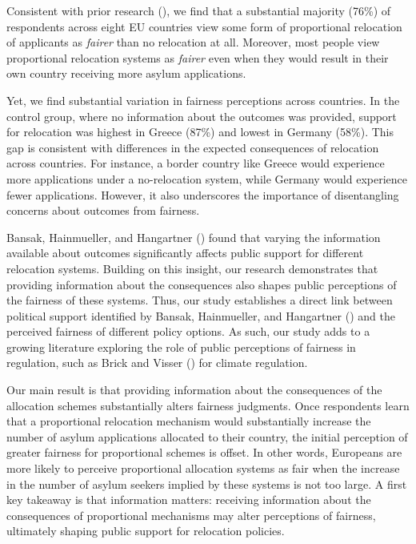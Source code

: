 \documentclass[
  12pt,
  a4paper,
]{article}
\begin{document}
Consistent with prior research (), we find that a substantial majority (76\%) of respondents across eight EU countries view some form of proportional relocation of applicants as \emph{fairer} than no relocation at all. Moreover, most people view proportional relocation systems as \emph{fairer} even when they would result in their own country receiving more asylum applications.

Yet, we find substantial variation in fairness perceptions across countries. In the control group, where no information about the outcomes was provided, support for relocation was highest in Greece (87\%) and lowest in Germany (58\%). This gap is consistent with differences in the expected consequences of relocation across countries. For instance, a border country like Greece would experience more applications under a no-relocation system, while Germany would experience fewer applications. However, it also underscores the importance of disentangling concerns about outcomes from fairness.

Bansak, Hainmueller, and Hangartner () found that varying the information available about outcomes significantly affects public support for different relocation systems. Building on this insight, our research demonstrates that providing information about the consequences also shapes public perceptions of the fairness of these systems. Thus, our study establishes a direct link between political support identified by Bansak, Hainmueller, and Hangartner () and the perceived fairness of different policy options. As such, our study adds to a growing literature exploring the role of public perceptions of fairness in regulation, such as Brick and Visser () for climate regulation.

Our main result is that providing information about the consequences of the allocation schemes substantially alters fairness judgments. Once respondents learn that a proportional relocation mechanism would substantially increase the number of asylum applications allocated to their country, the initial perception of greater fairness for proportional schemes is offset. In other words, Europeans are more likely to perceive proportional allocation systems as fair when the increase in the number of asylum seekers implied by these systems is not too large. A first key takeaway is that information matters: receiving information about the consequences of proportional mechanisms may alter perceptions of fairness, ultimately shaping public support for relocation policies.
\end{document}
